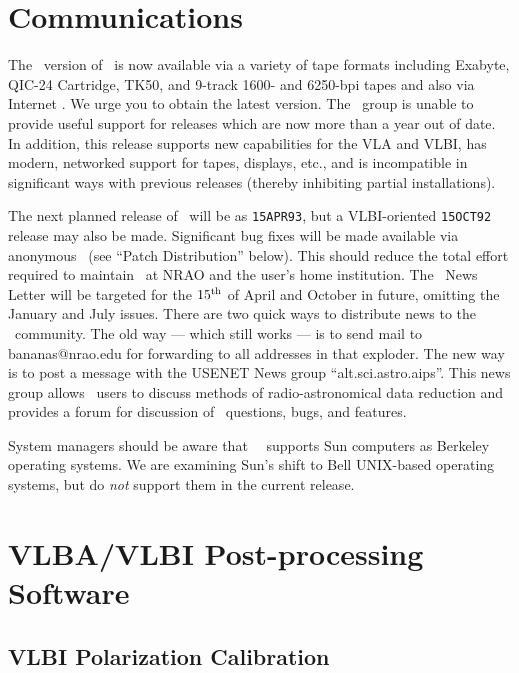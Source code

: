 \section{Communications}

The \RELEASENAME\ version of \AIPS\ is now available via a variety of
tape formats including Exabyte, QIC-24 Cartridge, TK50, and 9-track
1600- and 6250-bpi tapes and also via Internet \ftp.  We urge you to
obtain the latest version.  The \AIPS\ group is unable to provide
useful support for releases which are now more than a year out of
date.  In addition, this release supports new capabilities for the VLA
and VLBI, has modern, networked support for tapes, displays, etc., and
is incompatible in significant ways with previous releases (thereby
inhibiting partial installations).

The next planned release of \AIPS\ will be as {\tt 15APR93}, but
a VLBI-oriented {\tt 15OCT92} release may also be made.  Significant
bug fixes will be made available via anonymous \ftp\ (see ``Patch
Distribution'' below).  This should reduce the total effort required
to maintain \AIPS\ at NRAO and the user's home institution.  The
\AIPS\ News Letter will be targeted for the $15^{{\rm th}}$ of April and
October in future, omitting the January and July issues.  There are
two quick ways to distribute news to the \AIPS\ community.  The old
way --- which still works --- is to send mail to bananas@nrao.edu for
forwarding to all addresses in that exploder.  The new way is to post
a message with the USENET News group ``alt.sci.astro.aips''.  This
news group allows \AIPS\ users to discuss methods of
radio-astronomical data reduction and provides a forum for discussion
of \AIPS\ questions, bugs, and features.

System managers should be aware that \RELEASENAME\ \AIPS\ supports
Sun computers as Berkeley operating systems.  We are examining Sun's
shift to Bell UNIX-based operating systems, but do {\it not} support
them in the current release.

\clearpage

\section{VLBA/VLBI Post-processing Software}

\subsection{VLBI Polarization Calibration}

